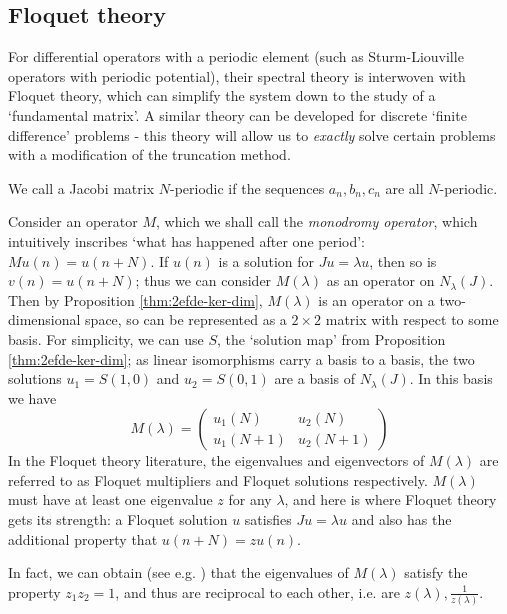 \documentclass[../main.tex]{subfiles}
\begin{document}
\subsection{Floquet theory}
For differential operators with a periodic element
(such as Sturm-Liouville operators with periodic potential), their spectral
theory is interwoven with Floquet theory, which can simplify the system down to
the study of a `fundamental matrix'. A similar theory can be developed for
discrete `finite difference' problems - this theory will allow us to
\emph{exactly} solve certain problems with a modification of the truncation
method.

We call a Jacobi matrix $N$-periodic if the sequences $a_n, b_n, c_n$ are all
$N$-periodic.

Consider an operator $M$, which we shall call the \emph{monodromy
operator}, which intuitively inscribes `what has
happened after one period': $Mu(n) = u(n+N)$. If $u(n)$ is a solution for $Ju =
\lambda u$, then so is $v(n) = u(n+N)$; thus we can consider $M(\lambda)$ as an
operator on $N_\lambda (J)$. Then by Proposition \ref{thm:2efde-ker-dim},
$M(\lambda)$ is an operator on a two-dimensional space, so can be represented as
a $2 \times 2$ matrix with respect to some basis. For simplicity, we can use
$S$, the `solution map' from Proposition \ref{thm:2efde-ker-dim}; as linear
isomorphisms carry a basis to a basis, the two solutions $u_1 = S(1, 0)$ and
$u_2 = S(0, 1)$ are a basis of $N_\lambda (J)$. In this basis we have
  $$
  M(\lambda) =
  \begin{pmatrix}
    u_1(N) & u_2(N) \\
    u_1(N+1) & u_2(N+1)
  \end{pmatrix}
  $$
In the Floquet theory literature, the eigenvalues and eigenvectors of
$M(\lambda)$ are referred to as Floquet multipliers and Floquet solutions
respectively. $M(\lambda)$ must have at least one eigenvalue $z$ for any
$\lambda$, and here is where Floquet theory gets its strength: a Floquet
solution $u$ satisfies $Ju = \lambda u$ and also has the additional property
that $u(n+N) = zu(n).$

In fact, we can obtain (see e.g. \cite{teschl2000jacobi}) that the eigenvalues
of $M(\lambda)$ satisfy the property $z_1 z_2 = 1$, and thus are reciprocal to
each other, i.e. are $z(\lambda), \frac{1}{z(\lambda)}$.
\end{document}
